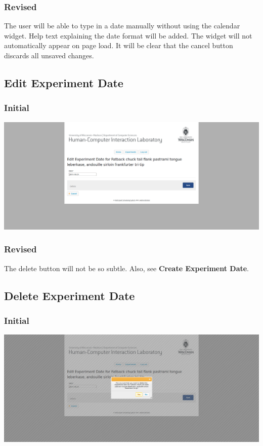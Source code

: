 \subsubsection{Revised}
The user will be able to type in a date manually without using the calendar widget. Help text explaining the date format will be added. The widget will not automatically appear on page load. It will be clear that the cancel button discards all unsaved changes.

\subsection{Edit Experiment Date}
\subsubsection{Initial}
\includegraphics[width=6in]{../other/initial-interface-design/edit-experiment-date.png}
\subsubsection{Revised}
The delete button will not be so subtle. Also, see {\bf Create Experiment Date}.

\subsection{Delete Experiment Date}
\subsubsection{Initial}
\includegraphics[width=6in]{../other/initial-interface-design/delete-experiment-date.png}
